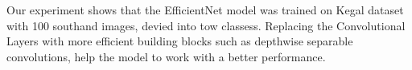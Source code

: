 Our experiment shows that the EfficientNet  model  was trained on Kegal dataset with 100 southand images, devied into tow classess. Replacing the Convolutional Layers with more efficient building blocks such as depthwise separable convolutions, help the model to work with a better performance. 

